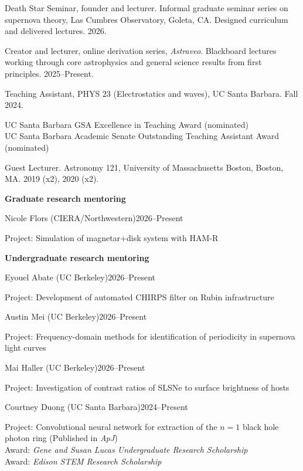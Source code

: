 \documentclass[margin,line]{res}
\newcommand{\mentee}[3]{%
  {\leftskip=5mm \noindent #1\hfill #2\par}%
  {\leftskip=11mm \noindent #3\par}%
  \vspace{1.5mm}}
\newcommand{\menteehead}[1]{\vspace{2mm}\noindent\textbf{#1}\par\vspace{0.5mm}}
\begin{document}
\begin{resume}
\vspace*{-2mm}
Death Star Seminar, founder and lecturer. Informal graduate seminar series on supernova theory, Las Cumbres Observatory, Goleta, CA. Designed curriculum and delivered lectures. 2026.

\vspace*{-2mm}
Creator and lecturer, online derivation series, \textit{Astraveo}. Blackboard lectures working through core astrophysics and general science results from first principles. 2025--Present. 

\vspace*{-2mm}
Teaching Assistant, PHYS 23 (Electrostatics and waves), UC Santa Barbara. Fall 2024.\par
\vspace{-0.4cm}
{\leftskip=4mm \noindent
{UC Santa Barbara GSA Excellence in Teaching Award (nominated)} \\
{UC Santa Barbara Academic Senate Outstanding Teaching Assistant Award (nominated)}\par}

\vspace*{-2mm}
Guest Lecturer. Astronomy 121, University of Massachusetts Boston, Boston, MA. 2019 (x2), 2020 (x2).

{\setlength{\parskip}{0pt}
 
\vspace*{0.3cm}
\menteehead{Graduate research mentoring}
 
\mentee{Nicole Flors (CIERA/Northwestern)}{2026--Present}
  {Project: Simulation of magnetar+disk system with HAM-R}
 
\menteehead{Undergraduate research mentoring}
 
\mentee{Eyouel Abate (UC Berkeley)}{2026--Present}
  {Project: Development of automated CHIRPS filter on Rubin infrastructure}
 
\mentee{Austin Mei (UC Berkeley)}{2026--Present}
  {Project: Frequency-domain methods for identification of periodicity in supernova light curves}
 
\mentee{Mai Haller (UC Berkeley)}{2026--Present}
  {Project: Investigation of contrast ratios of SLSNe to surface brightness of hosts}
 
\mentee{Courtney Duong (UC Santa Barbara)}{2024--Present}
  {Project: Convolutional neural network for extraction of the $n=1$ black hole photon ring (Published in \textit{ApJ}) \\
   Award: \textit{Gene and Susan Lucas Undergraduate Research Scholarship} \\
   Award: \textit{Edison STEM Research Scholarship}}
 
}
\end{resume}
\end{document}
